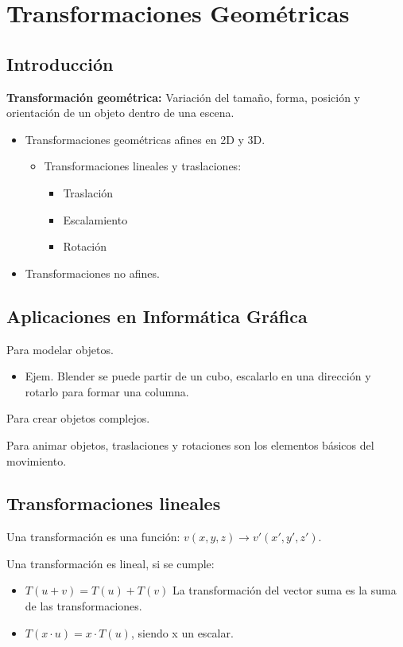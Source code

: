 \chapter{Transformaciones Geométricas}
\section{Introducción}
\textbf{Transformación geométrica:} Variación del tamaño, forma, posición y orientación de un objeto dentro de una escena.
\begin{itemize}
    \item Transformaciones geométricas afines en 2D y 3D.
    \begin{itemize}
        \item Transformaciones lineales y traslaciones:
        \begin{itemize}
            \item Traslación
            \item Escalamiento 
            \item Rotación
        \end{itemize}
    \end{itemize}
    \item Transformaciones no afines.
\end{itemize}

\section{Aplicaciones en Informática Gráfica}
Para modelar objetos.
\begin{itemize}
    \item Ejem. Blender se puede partir de un cubo, escalarlo en una dirección y rotarlo para formar una columna.
\end{itemize}

Para crear objetos complejos.

Para animar objetos, traslaciones y rotaciones son los elementos básicos del movimiento.

\section{Transformaciones lineales}
Una transformación es una función: $v(x,y,z) \rightarrow v'(x',y',z')$.

Una transformación es lineal, si se cumple:
\begin{itemize}
    \item $T(u+v) = T(u) + T(v)$ La transformación del vector suma es la suma de las transformaciones.
    \item $T(x\cdot u) = x\cdot T(u)$, siendo x un escalar.
\end{itemize}

